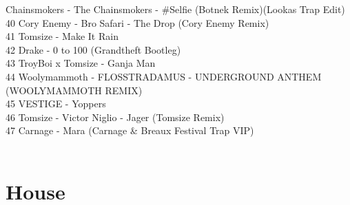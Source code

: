 \begin{multicols}{2}
Chainsmokers - The Chainsmokers - \#Selfie (Botnek Remix)(Lookas Trap Edit)\\ 40 Cory Enemy - Bro Safari - The Drop (Cory Enemy Remix)\\ 41 Tomsize - Make It Rain\\ 42 Drake - 0 to 100 (Grandtheft Bootleg)\\ 43 TroyBoi x Tomsize - Ganja Man\\ 44 Woolymammoth - FLOSSTRADAMUS - UNDERGROUND ANTHEM (WOOLYMAMMOTH REMIX)\\ 45 VESTIGE - Yoppers\\ 46 Tomsize - Victor Niglio - Jager (Tomsize Remix)\\ 47 Carnage - Mara (Carnage \& Breaux Festival Trap VIP)\\
\\
\section*{House}

\end{multicols}
